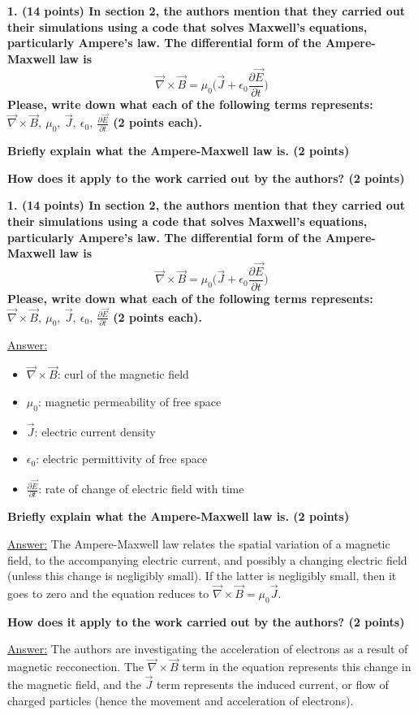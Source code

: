 \documentclass[12pt]{article}
\begin{document}
\textbf{
1. (14 points)
In section 2, the authors mention that they carried out their
simulations using a code that solves Maxwell's equations, particularly
Ampere's law. The differential form of the Ampere-Maxwell law is
    $$ \vec{\nabla}\times\vec{B} = \mu_0\Big( \vec{J} + \epsilon_0\frac
    {\partial \vec{E}}{\partial t}\Big) $$
Please, write down what each of the following terms represents:
 $\vec{\nabla}\times\vec{B},\ \mu_0,\ \vec{J},\
 \epsilon_0,\ \frac{\partial\vec{E}}{\partial t}$
(2 points each).
}

\textbf{Briefly explain what the Ampere-Maxwell law is. (2 points)}

\textbf{How does it apply to the work carried out by the authors?
(2 points)}

\newpage
\textbf{
1. (14 points)
In section 2, the authors mention that they carried out their
simulations using a code that solves Maxwell's equations, particularly
Ampere's law. The differential form of the Ampere-Maxwell law is
    $$ \vec{\nabla}\times\vec{B} = \mu_0\Big( \vec{J} + \epsilon_0\frac
    {\partial \vec{E}}{\partial t}\Big) $$
Please, write down what each of the following terms represents:
 $\vec{\nabla}\times\vec{B},\ \mu_0,\ \vec{J},\
 \epsilon_0,\ \frac{\partial\vec{E}}{\partial t}$
(2 points each).
}

\underline{Answer:}
\begin{itemize}
    \item $\vec{\nabla}\times\vec{B}$: curl of the magnetic field
    \item $\mu_0$: magnetic permeability of free space
    \item $\vec{J}$: electric current density
    \item $\epsilon_0$: electric permittivity of free space
    \item $\frac{\partial\vec{E}}{\partial t}$: rate of change of
    electric field with time
\end{itemize}

\textbf{Briefly explain what the Ampere-Maxwell law is. (2 points)}

\underline{Answer:} The Ampere-Maxwell law
relates the spatial variation of a magnetic field,
to the accompanying electric
current, and possibly a changing electric field
(unless this change is negligibly small).
If the latter is negligibly small,
then it goes to zero and the equation reduces to
$ \vec{\nabla}\times\vec{B} = \mu_0\vec{J} $.

\textbf{How does it apply to the work carried out by the authors?
(2 points)}

\underline{Answer:} The authors are investigating the acceleration of
electrons as a result of magnetic recconection.
The $\vec{\nabla}\times\vec{B}$ term in the equation
represents this change in the magnetic field,
and the $\vec{J}$ term represents the induced current, or
flow of charged particles (hence the movement and
acceleration of electrons).
\end{document}
